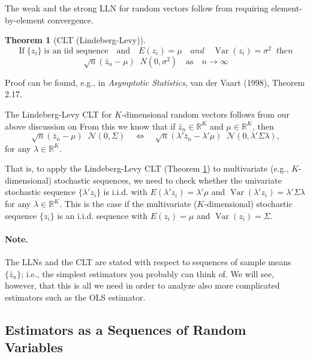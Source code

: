 \documentclass[
  14pt,
]{memoir}
\DeclareMathOperator{\V}{\operatorname{Var}}
\DeclareMathOperator{\todistr}{\overset{d}{\longrightarrow}}
\newtheorem{theorem}{Theorem}[section]
\begin{document}
The weak and the strong LLN for random vectors follow from requiring element-by-element convergence.

\begin{theorem}[CLT (Lindeberg-Levy)]\label{CLT1}
$$\text{If}\;\{z_i\}\;\text{is an iid sequence}\quad\text{and}\quad E(z_i)=\mu\quad\textit{and}\quad\V(z_i)=\sigma^2\;\;\textit{then}$$
$$\sqrt{n}(\bar{z}_n-\mu)\todistr N(0,\sigma^2)\quad\text{as}\quad n\to\infty$$
\end{theorem}

\noindent Proof can be found, e.g., in \emph{Asymptotic Statistics}, van der Vaart (1998), Theorem 2.17.

\bigskip

The Lindeberg-Levy CLT for \(K\)-dimensional random vectors follows from our above discussion on  From this we know that if \(\bar{z}_n\in\mathbb{R}^K\) and \(\mu\in\mathbb{R}^K\), then
\[\sqrt{n}(\bar{z}_n-\mu)\todistr \mathcal{N}(0,\Sigma)\quad\Leftrightarrow\quad \sqrt{n}(\lambda'\bar{z}_n-\lambda'\mu)\todistr \mathcal{N}(0,\lambda'\Sigma\lambda),\]
for any \(\lambda\in\mathbb{R}^K\).

That is, to apply the Lindeberg-Levy CLT (Theorem \ref{CLT1}) to multivariate (e.g., \(K\)-dimensional) stochastic sequences, we need to check whether the univariate stochastic sequence \(\{\lambda'z_i\}\) is i.i.d. with \(E(\lambda'z_i)=\lambda'\mu\) and \(\V(\lambda'z_i)=\lambda'\Sigma\lambda\) for any \(\lambda\in\mathbb{R}^K\). This is the case if the multivariate (\(K\)-dimensional) stochastic sequence \(\{z_i\}\) is an i.i.d. sequence with \(E(z_i)=\mu\) and \(\V(z_i)=\Sigma\).

\paragraph*{Note.}

The LLNs and the CLT are stated with respect to sequences of sample means \(\{\bar{z}_n\}\); i.e., the simplest estimators you probably can think of. We will see, however, that this is all we need in order to analyze also more complicated estimators such as the OLS estimator.

\hypertarget{estimators-as-a-sequences-of-random-variables}{%
\subsection{Estimators as a Sequences of Random Variables}\label{estimators-as-a-sequences-of-random-variables}}
\end{document}
